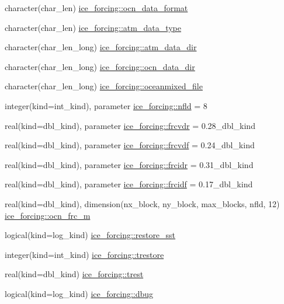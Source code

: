 \begin{DoxyCompactItemize}
\item 
character(char\_\-len) \hyperlink{namespaceice__forcing_a9d9be81629d968253c14a8c0a5984bda}{ice\_\-forcing::ocn\_\-data\_\-format}
\item 
character(char\_\-len) \hyperlink{namespaceice__forcing_a0a79982d0d62aeee3a33ef50513f3d23}{ice\_\-forcing::atm\_\-data\_\-type}
\item 
character(char\_\-len\_\-long) \hyperlink{namespaceice__forcing_ade690adebb1115f5b496db9148e05784}{ice\_\-forcing::atm\_\-data\_\-dir}
\item 
character(char\_\-len\_\-long) \hyperlink{namespaceice__forcing_a654560673c82ff131fd490ed0e7f36ff}{ice\_\-forcing::ocn\_\-data\_\-dir}
\item 
character(char\_\-len\_\-long) \hyperlink{namespaceice__forcing_aec28b3a9dba2ddef0ac023a96fc361bc}{ice\_\-forcing::oceanmixed\_\-file}
\item 
integer(kind=int\_\-kind), parameter \hyperlink{namespaceice__forcing_ae1362a8a47b05e49acfce2142d98fdd5}{ice\_\-forcing::nfld} = 8
\item 
real(kind=dbl\_\-kind), parameter \hyperlink{namespaceice__forcing_a076bfda8ebb5a4f63d65ec503c12f0d4}{ice\_\-forcing::frcvdr} = 0.28\_\-dbl\_\-kind
\item 
real(kind=dbl\_\-kind), parameter \hyperlink{namespaceice__forcing_ab32ef53cee9c09cc217d6228c94dcf44}{ice\_\-forcing::frcvdf} = 0.24\_\-dbl\_\-kind
\item 
real(kind=dbl\_\-kind), parameter \hyperlink{namespaceice__forcing_a11540aeb60ff2b8a10675369dde6d6c3}{ice\_\-forcing::frcidr} = 0.31\_\-dbl\_\-kind
\item 
real(kind=dbl\_\-kind), parameter \hyperlink{namespaceice__forcing_ad4255bb85a309ae7a9ee20c1e951aa07}{ice\_\-forcing::frcidf} = 0.17\_\-dbl\_\-kind
\item 
real(kind=dbl\_\-kind), dimension(nx\_\-block, ny\_\-block, max\_\-blocks, nfld, 12) \hyperlink{namespaceice__forcing_a726eacdcd2c76eb6ed122e4b1543d02d}{ice\_\-forcing::ocn\_\-frc\_\-m}
\item 
logical(kind=log\_\-kind) \hyperlink{namespaceice__forcing_a08581fb1de6afa9fa693b22a508447ff}{ice\_\-forcing::restore\_\-sst}
\item 
integer(kind=int\_\-kind) \hyperlink{namespaceice__forcing_a5a4e01d0d2029ae1b1f11eb0c3ce5d8c}{ice\_\-forcing::trestore}
\item 
real(kind=dbl\_\-kind) \hyperlink{namespaceice__forcing_a6a5e91929910782bb955be2569a01a35}{ice\_\-forcing::trest}
\item 
logical(kind=log\_\-kind) \hyperlink{namespaceice__forcing_a22e743605ad0e639e906f24289ef0cb1}{ice\_\-forcing::dbug}
\end{DoxyCompactItemize}
